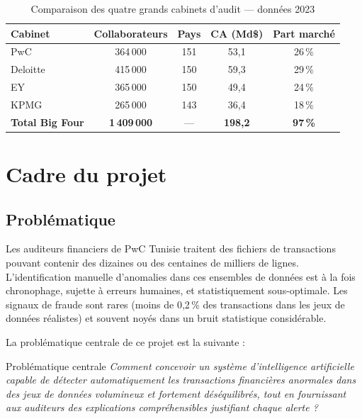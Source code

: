 \documentclass[12pt,a4paper,twoside]{report}
\theoremstyle{definition}
\begin{document}
\begin{table}[H]
\centering
\caption{Comparaison des quatre grands cabinets d'audit — données 2023}
\label{tab:bigfour}
\renewcommand{\arraystretch}{1.3}
\begin{tabular}{lcccc}
\toprule
\textbf{Cabinet} & \textbf{Collaborateurs} & \textbf{Pays} & \textbf{CA (Md\$)} & \textbf{Part marché} \\
\midrule
\rowcolor{pwcorange!20}
PwC         & 364\,000 & 151 & 53,1 & 26\,\% \\
Deloitte    & 415\,000 & 150 & 59,3 & 29\,\% \\
EY          & 365\,000 & 150 & 49,4 & 24\,\% \\
KPMG        & 265\,000 & 143 & 36,4 & 18\,\% \\
\midrule
\textbf{Total Big Four} & \textbf{1\,409\,000} & — & \textbf{198,2} & \textbf{97\,\%} \\
\bottomrule
\end{tabular}
\end{table}

\section{Cadre du projet}

\subsection{Problématique}

Les auditeurs financiers de PwC Tunisie traitent des fichiers de transactions pouvant
contenir des dizaines ou des centaines de milliers de lignes. L'identification manuelle
d'anomalies dans ces ensembles de données est à la fois chronophage, sujette à erreurs
humaines, et statistiquement sous-optimale. Les signaux de fraude sont rares (moins de
0,2\,\% des transactions dans les jeux de données réalistes) et souvent noyés dans un
bruit statistique considérable.

La problématique centrale de ce projet est la suivante :

\begin{pwcbox}{Problématique centrale}
\textit{Comment concevoir un système d'intelligence artificielle capable de détecter
automatiquement les transactions financières anormales dans des jeux de données
volumineux et fortement déséquilibrés, tout en fournissant aux auditeurs des
explications compréhensibles justifiant chaque alerte ?}
\end{pwcbox}
\end{document}
